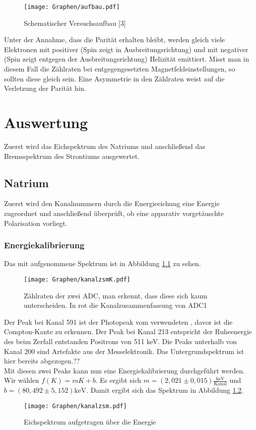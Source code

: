 \documentclass[twoside,colorback,accentcolor=tud4c,11pt]{tudreport}
\begin{document}
  
\begin{figure}[H]
\centering
   	\begin{minipage}[b]{1\textwidth}
   	\texttt{[image: Graphen/aufbau.pdf]}
   	\caption{Schematischer Versuchsaufbau [3]}
  	\label{Aa}
   	\end{minipage}
\end{figure}  


Unter der Annahme, dass die Parität erhalten bleibt, werden gleich viele Elektronen mit positiver (Spin zeigt in Ausbreitungsrichtung) und mit negativer (Spin zeigt entgegen der Ausbreitungsrichtung) Helizität emittiert. Misst man in diesem Fall die Zählraten bei entgegengesetzten Magnetfeldeinstellungen, so sollten diese gleich sein. Eine Asymmetrie in den Zählraten weist auf die Verletzung der Parität hin. 
     	     	
\chapter{Auswertung}
Zuerst wird das Eichspektrum des Natriums und anschließend das Bremsspektrum des Strontiums ausgewertet.
\section{Natrium}
Zuerst wird den Kanalnummern durch die Energieeichung eine Energie zugeordnet und anschließend überprüft, ob eine apparativ vorgetäuschte Polarisation vorliegt.
\subsection{Energiekalibrierung}
Das mit  aufgenommene Spektrum ist in Abbildung \ref{fig:kanalK} zu sehen.
\begin{figure}[H]
\centering
   	\begin{minipage}[b]{\textwidth}
   	\texttt{[image: Graphen/kanalzsmK.pdf]}
   	\caption{Zählraten der zwei ADC, man erkennt, dass diese sich kaum unterscheiden. In rot die Kanalzusammenfassung von ADC1}
  	\label{fig:kanalK}
   	\end{minipage}
\end{figure}
Der Peak bei Kanal 591 ist der Photopeak vom verwendeten , davor ist die Compton-Kante zu erkennen. Der Peak bei Kanal 213 entspricht der Ruheenergie des beim Zerfall entstanden Positrons von 511 keV. Die Peaks unterhalb von Kanal 200 sind Artefakte aus der Messelektronik. Das Untergrundspektrum ist hier bereits abgezogen.??\\
Mit diesen zwei Peaks kann nun eine Energiekalibrierung durchgeführt werden. Wir wählen $ f(K)=mK+b $. Es ergibt sich $ m=(2,021\pm0,015)\frac{\text{keV}}{\text{Kanal}} $ und $ b=(80,492\pm5,152) \text{keV}$. Damit ergibt sich das Spektrum in Abbildung \ref{fig:kanal}.
\begin{figure}[H]
\centering
   	\begin{minipage}[b]{\textwidth}
   	\centering
   	\texttt{[image: Graphen/kanalzsm.pdf]}
   	\caption{Eichspektrum aufgetragen über die Energie}
  	\label{fig:kanal}
   	\end{minipage}
\end{figure}
\end{document}
